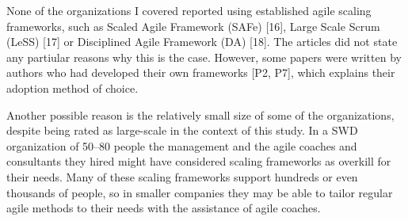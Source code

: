 None of the organizations I covered reported using established agile
scaling frameworks, such as Scaled Agile Framework (SAFe) [16], Large
Scale Scrum (LeSS) [17] or Disciplined Agile Framework (DA) [18]. The
articles did not state any partiular reasons why this is the case.
However, some papers were written by authors who had developed their own
frameworks [P2, P7], which explains their adoption method of choice.

Another possible reason is the relatively small size of some of the
organizations, despite being rated as large-scale in the context of this
study. In a SWD organization of 50–80 people the management and the
agile coaches and consultants they hired might have considered scaling
frameworks as overkill for their needs. Many of these scaling frameworks
support hundreds or even thousands of people, so in smaller companies
they may be able to tailor regular agile methods to their needs with the
assistance of agile coaches.
